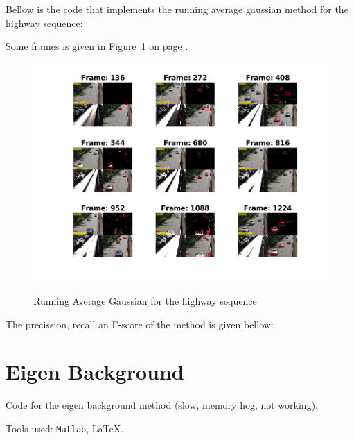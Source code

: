 \documentclass[a4paper,12pt]{article}
\begin{document}
Bellow is the code that implements the running average gaussian method for the highway sequence:
\vspace{10pt}

\vspace{30pt}

Some frames is given in Figure~\ref{fig:faverageh} on page \pageref{fig:faverageh}.

\begin{figure}[Ht]
\centering
\includegraphics{../Videos/highway_avg_gauss.png}
\label{fig:faverageh}
\caption{Running Average Gaussian for the highway sequence}
\end{figure} 


\vspace{10pt}

The precission, recall an F-score of the method is given bellow:


\section{Eigen Background}
Code for the eigen background method (slow, memory hog, not working).

\vspace{10pt}

\vspace{30pt}



\vfill
\noindent Tools used: \texttt{Matlab}, \LaTeX{}.
\end{document}
